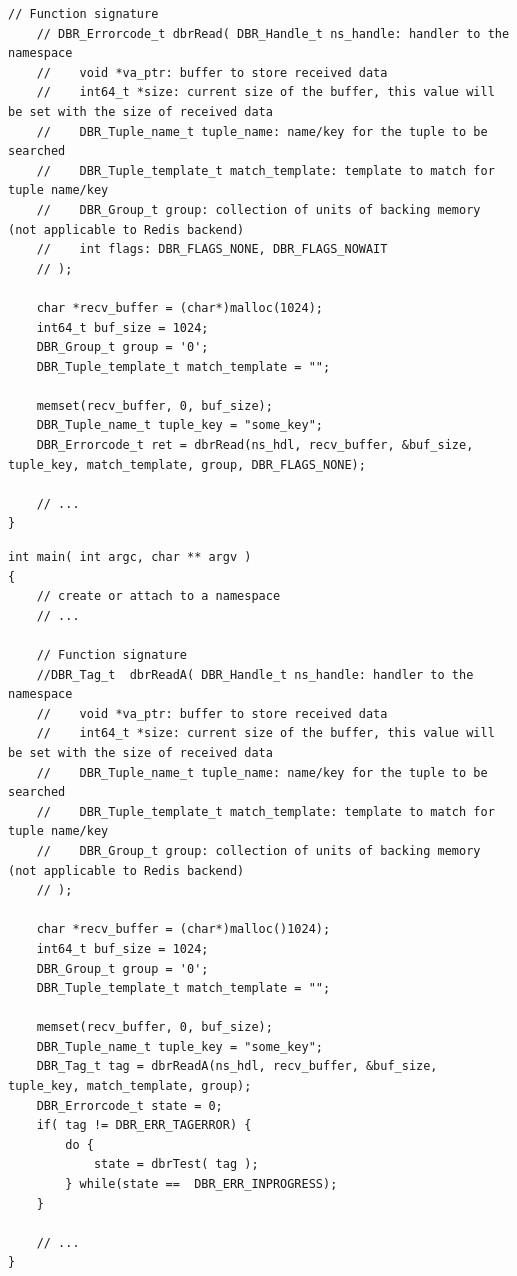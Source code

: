 \begin{enumerate}
\begin{lstlisting}[style=mystyle,basicstyle=\scriptsize\ttfamily,caption=Read data from the namespace (blocking), label=code:read]
	// Function signature
	// DBR_Errorcode_t dbrRead( DBR_Handle_t ns_handle: handler to the namespace
    //    void *va_ptr: buffer to store received data
    //    int64_t *size: current size of the buffer, this value will be set with the size of received data 
    //    DBR_Tuple_name_t tuple_name: name/key for the tuple to be searched
    //    DBR_Tuple_template_t match_template: template to match for tuple name/key
    //    DBR_Group_t group: collection of units of backing memory (not applicable to Redis backend)
    //    int flags: DBR_FLAGS_NONE, DBR_FLAGS_NOWAIT
    // );
	
	char *recv_buffer = (char*)malloc(1024);
	int64_t buf_size = 1024;
	DBR_Group_t group = '0';
	DBR_Tuple_template_t match_template = "";
    
    memset(recv_buffer, 0, buf_size);
	DBR_Tuple_name_t tuple_key = "some_key";
	DBR_Errorcode_t ret = dbrRead(ns_hdl, recv_buffer, &buf_size, tuple_key, match_template, group, DBR_FLAGS_NONE);
	
	// ...
}
\end{lstlisting}
  
\begin{lstlisting}[style=mystyle,basicstyle=\scriptsize\ttfamily,caption=Read data from the namespace (non-blocking), label=code:readA]
int main( int argc, char ** argv )
{
	// create or attach to a namespace
	// ...

    // Function signature
    //DBR_Tag_t  dbrReadA( DBR_Handle_t ns_handle: handler to the namespace 
    //    void *va_ptr: buffer to store received data
    //    int64_t *size: current size of the buffer, this value will be set with the size of received data 
    //    DBR_Tuple_name_t tuple_name: name/key for the tuple to be searched
    //    DBR_Tuple_template_t match_template: template to match for tuple name/key
    //    DBR_Group_t group: collection of units of backing memory (not applicable to Redis backend)
    // );

	char *recv_buffer = (char*)malloc()1024);
	int64_t buf_size = 1024;
	DBR_Group_t group = '0';
	DBR_Tuple_template_t match_template = "";
	
	memset(recv_buffer, 0, buf_size);
	DBR_Tuple_name_t tuple_key = "some_key";
	DBR_Tag_t tag = dbrReadA(ns_hdl, recv_buffer, &buf_size, tuple_key, match_template, group);
	DBR_Errorcode_t state = 0;
	if( tag != DBR_ERR_TAGERROR) {
		do {
			state = dbrTest( tag );
		} while(state ==  DBR_ERR_INPROGRESS);
	}
	
	// ...
}
\end{lstlisting}



\end{enumerate}
